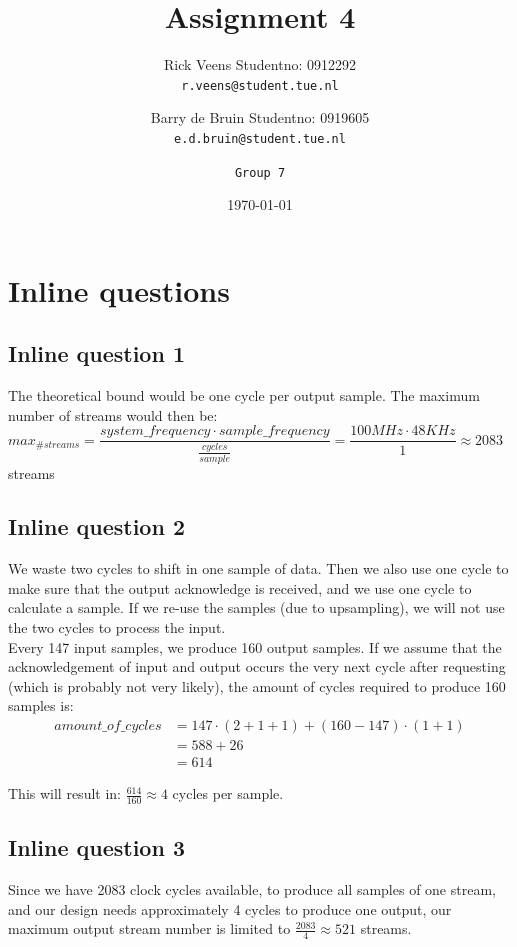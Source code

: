 \documentclass[a4paper,twoside,11pt, fleqn]{article}
\title{\vspace{-\baselineskip}\sffamily\bfseries Assignment 4}
\author{
	Rick Veens \qquad Studentno: 0912292\\
	\texttt{r.veens@student.tue.nl}
	\and
	Barry de Bruin \qquad Studentno: 0919605\\
	\texttt{e.d.bruin@student.tue.nl}
	\and
	\texttt{Group 7}
}
\date{\today}
\begin{document}
\maketitle
\newpage

\tableofcontents

\newpage
\section{Inline questions}
\subsection{Inline question 1}
The theoretical bound would be one cycle per output sample. The maximum number of streams would then be:\\

$max_{\# streams} = \dfrac{system\_frequency \cdot sample\_frequency}{\frac{cycles}{sample}} = \dfrac{100MHz \cdot 48KHz}{1} \approx 2083$ streams\\

\subsection{Inline question 2}
We waste two cycles to shift in one sample of data. Then we also use one cycle to make sure that the output acknowledge is received, and we use one cycle to calculate a sample. If we re-use the samples (due to upsampling), we will not use the two cycles to process the input.\\

Every 147 input samples, we produce 160 output samples. If we assume that the acknowledgement of input and output occurs the very next cycle after requesting (which is probably not very likely), the amount of cycles required to produce 160 samples is:
\begin{align*}
amount\_of\_cycles &= 147\cdot (2 + 1 + 1) + (160-147)\cdot (1  + 1 )\\
&= 588 + 26\\
&= 614
\end{align*}

This will result in: $\frac{614}{160} \approx 4$ cycles per sample. 

\subsection{Inline question 3}
Since we have 2083 clock cycles available, to produce all samples of one stream, and our design needs approximately 4 cycles to produce one output, our maximum output stream number is limited to $\frac{2083}{4} \approx 521$ streams.
\end{document}
